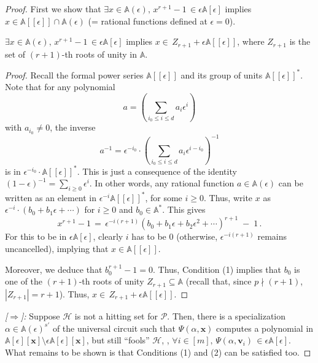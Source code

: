 \documentclass{toc}
\newcommand{\calH}{\mathcal{H}}
\newcommand{\calP}{\mathcal{P}}
\newcommand{\aff}{\mathbb{A}}
\begin{document}
\begin{proof}
%
First we show that %
$\exists x\in \aff(\epsilon),\, {x}^{r+1}- 1 \,\in \epsilon\aff[\epsilon]$ implies $x\in \aff[[\epsilon]]\cap \aff(\epsilon)$ (= rational functions defined at $\epsilon=0$).

\begin{claim}\label{defined at zero}
  $\exists x\in \aff(\epsilon),\, {x}^{r+1}- 1 \,\in \epsilon\aff[\epsilon]$ implies $x\in \, Z_{r+1} + \epsilon\aff[[\epsilon]]$, where 
  $Z_{r+1}$ is the set of $(r+1)$-th roots of unity in $\aff$. 
\end{claim}

 \begin{proof}

Recall the formal power series $\aff[[\epsilon]]$ and its group of units $\aff[[\epsilon]]^*$.
Note that for any polynomial
\[
  a=\left(\sum_{i_0\le i\le d} a_i\epsilon^i\right)
\]
with $a_{i_0}\ne0$, the inverse
\[
  a^{-1} = \epsilon^{-i_0}\cdot \left(\sum_{i_0\le i\le d}
  a_i\epsilon^{i-i_0}\right)^{-1}
\]
is in $\epsilon^{-i_0}\cdot \aff[[\epsilon]]^*$. This is just a
consequence of the identity
$(1-\epsilon)^{-1} = \sum_{i\ge0} \epsilon^i$. In other words, any
rational function $a\in \aff(\epsilon)$ can be written as an element
in $\epsilon^{-i}\aff[[\epsilon]]^*$, for some $i\ge0$. Thus, write
$x$ as $\epsilon^{-i}\cdot(b_0+b_1\epsilon+\cdots)$ for $i\ge0$ and
$b_0\in\aff^*$. This gives
$${x}^{r+1}- 1 \,=\, \epsilon^{-i(r+1)}(b_0+b_1\epsilon+ b_2\epsilon^{2} +\cdots)^{r+1} \;-\; 1 \,.$$
For this to be in $\epsilon\aff[\epsilon]$, clearly $i$ has to be $0$ (otherwise, $\epsilon^{-i(r+1)}$ remains 
%
uncancelled), %
implying that $x\in \aff[[\epsilon]]$. 

Moreover, we deduce that $b_0^{r+1} - 1 = 0$. Thus, 
%
Condition (1) %
implies that $b_0$ is one of the $(r+1)$-th roots of unity $Z_{r+1}\subseteq\aff$ (recall that, since $p\nmid(r+1)$, $|Z_{r+1}|=r+1$). Thus, $x\in \, Z_{r+1} + \epsilon\aff[[\epsilon]]$.
\end{proof}

\smallskip\emph{[$\Rightarrow$]:}
Suppose $\mathcal{H}$ is not a hitting set for $\calP$. Then, there is a specialization $\alpha \in \aff(\epsilon)^{s'}$ of the universal circuit such that $\Psi(\alpha, \mathbf x)$ computes a polynomial in $\aff[\epsilon][\mathbf x]\setminus \epsilon\aff[\epsilon][\mathbf x]$, but still ``fools'' $\calH$, \ie, $\forall i \in [m],\, \Psi(\alpha,\mathbf{v}_i) \,\in \epsilon\aff[\epsilon]$. 
What remains to be shown is that 
%
Conditions %
(1) and (2) 
can be satisfied too.


\end{proof}
\end{document}

